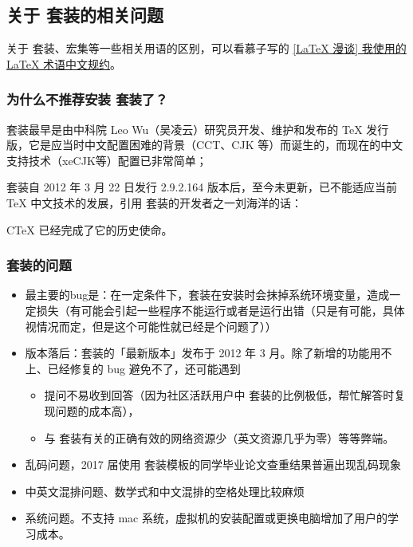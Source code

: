 
\subsection{关于 \CTeX 套装的相关问题}

关于 \CTeX 套装、\CTeX 宏集等一些相关用语的区别，可以看慕子写的 \href{https://zhuanlan.zhihu.com/p/45350320}{[LaTeX 漫谈] 我使用的 LaTeX 术语中文规约}。

\subsubsection{为什么不推荐安装 \CTeX 套装了？}

\CTeX 套装最早是由中科院 Leo Wu（吴凌云）研究员开发、维护和发布的 \TeX{} 发行版，它是应当时中文配置困难的背景（CCT、CJK 等）而诞生的，而现在的中文支持技术（xeCJK等）配置已非常简单；

\CTeX 套装自 2012 年 3 月 22 日发行 2.9.2.164 版本后，至今未更新，已不能适应当前 TeX 中文技术的发展，引用 \CTeX 套装的开发者之一刘海洋的话：
\begin{latexexample}
  CTeX 已经完成了它的历史使命。
\end{latexexample}


\subsubsection{\CTeX 套装的问题}

\begin{itemize}
  \item 最主要的bug是：在一定条件下，\CTeX 套装在安装时会抹掉系统环境变量，造成一定损失（有可能会引起一些程序不能运行或者是运行出错（只是有可能，具体视情况而定，但是这个可能性就已经是个问题了））
  \item 版本落后：\CTeX 套装的「最新版本」发布于 2012 年 3 月。除了新增的功能用不上、已经修复的 bug 避免不了，还可能遇到
    \begin{itemize}
      \item 提问不易收到回答（因为社区活跃用户中 \CTeX 套装的比例极低，帮忙解答时复现问题的成本高），
      \item 与 \CTeX 套装有关的正确有效的网络资源少（英文资源几乎为零）等等弊端。
    \end{itemize}
  \item 乱码问题，2017 届使用 \CTeX 套装模板的同学毕业论文查重结果普遍出现乱码现象
  \item 中英文混排问题、数学式和中文混排的空格处理比较麻烦
  \item 系统问题。不支持 mac 系统，虚拟机的安装配置或更换电脑增加了用户的学习成本。
\end{itemize}



